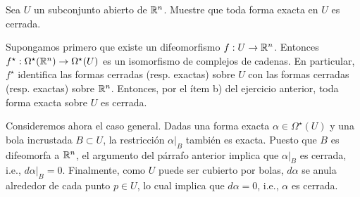 \begin{exercise}
Sea $U$ un subconjunto abierto de $\mathbb R^n$. Muestre que toda forma exacta en $U$ es cerrada.
\end{exercise}

\begin{solution}
Supongamos primero que existe un difeomorfismo $f : U \to \mathbb R^n$. Entonces $f^\star : \Omega^\star(\mathbb R^n) \to \Omega^\star(U)$ es un isomorfismo de complejos de cadenas. En particular, $f^\star$ identifica las formas cerradas (resp. exactas) sobre $U$ con las formas cerradas (resp. exactas) sobre $\mathbb R^n$. Entonces, por el ítem b) del ejercicio anterior, toda forma exacta sobre $U$ es cerrada.

Consideremos ahora el caso general. Dadas una forma exacta $\alpha \in \Omega^\star(U)$ y una bola incrustada $B \subset U$, la restricción $\alpha|_B$ también es exacta. Puesto que $B$ es difeomorfa a $\mathbb R^n$, el argumento del párrafo anterior implica que $\alpha|_B$ es cerrada, i.e., $d\alpha|_B = 0$. Finalmente, como $U$ puede ser cubierto por bolas, $d\alpha$ se anula alrededor de cada punto $p \in U$, lo cual implica que $d\alpha = 0$, i.e., $\alpha$ es cerrada.
\end{solution}
